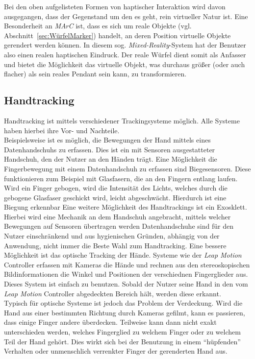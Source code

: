 Bei den oben aufgelisteten Formen von haptischer Interaktion wird davon ausgegangen, dass der Gegenstand um den es geht, rein virtueller Natur ist. Eine Besonderheit an \textit{MArC} ist, dass es sich um reale Objekte (vgl. Abschnitt~\ref{sec:WürfelMarker}) handelt, an deren Position virtuelle Objekte gerendert werden können. In diesem sog. \textit{Mixed-Reality}-System hat der Benutzer also einen realen haptischen Eindruck. Der reale Würfel dient somit als Anfasser und bietet die Möglichkeit das virtuelle Objekt, was durchaus größer (oder auch flacher) als sein reales Pendant sein kann, zu transformieren. 



\subsection{Handtracking}\label{sec:HandtrackingAnwendungen}%

Handtracking ist mittels verschiedener Trackingsysteme möglich. Alle Systeme haben hierbei ihre Vor- und Nachteile.\\
Beispielsweise ist es möglich, die Bewegungen der Hand mittels eines Datenhandschuhs zu erfassen. Dies ist ein mit Sensoren ausgestatteter Handschuh, den der Nutzer an den Händen trägt. Eine Möglichkeit die Fingerbewegung mit einem Datenhandschuh zu erfassen sind Biegesensoren. Diese funktionieren zum Beispiel mit Glasfasern, die an den Fingern entlang laufen. Wird ein Finger gebogen, wird die Intensität des Lichts, welches durch die gebogene Glasfaser geschickt wird, leicht abgeschwächt. Hierdurch ist eine Biegung erkennbar \cite{DoernerBrollEtAl2013}
Eine weitere Möglichkeit des Handtrackings ist ein Exosklett. Hierbei wird eine Mechanik an dem Handschuh angebracht, mittels welcher Bewegungen auf Sensoren übertragen werden\cite{DoernerBrollEtAl2013}
Datenhandschuhe sind für den Nutzer einschränkend und aus hygienischen Gründen, abhängig von der Anwendung,  nicht immer die Beste Wahl zum Handtracking.
Eine bessere Möglichkeit ist das optische Tracking der Hände. Systeme wie der \textit{Leap Motion} Controller erfassen mit Kameras die Hände und rechnen aus den stereoskopischen Bildinformationen die Winkel und Positionen der verschiednen Fingerglieder aus.\\
Dieses System ist einfach zu benutzen. Sobald der Nutzer seine Hand in den vom \emph{Leap Motion} Controller abgedeckten Bereich hält, werden diese erkannt.\\
Typisch für optische Systeme ist jedoch das Problem der Verdeckung. Wird die Hand aus einer bestimmten Richtung durch Kameras gefilmt, kann es passieren, dass einige Finger andere überdecken. Teilweise kann dann nicht exakt unterschieden werden, welches Fingerglied zu welchem Finger oder zu welchem Teil der Hand gehört. Dies wirkt sich bei der Benutzung in einem "`hüpfenden"' Verhalten oder unmenschlich verrenkter Finger der gerenderten Hand aus.

